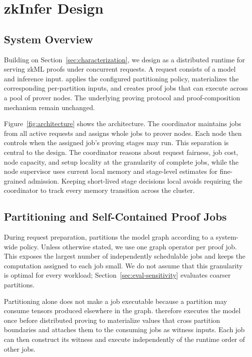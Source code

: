 \section{zkInfer Design}
\label{sec:design}

\subsection{System Overview}
\label{sec:system-overview}

Building on Section~\ref{sec:characterization}, we design \TITLE{} as a distributed runtime for serving zkML proofs under concurrent requests. A request consists of a model and inference input. \TITLE{} applies the configured partitioning policy, materializes the corresponding per-partition inputs, and creates proof jobs that can execute across a pool of prover nodes. The underlying proving protocol and proof-composition mechanism remain unchanged.

Figure~\ref{fig:architecture} shows the architecture. The coordinator maintains jobs from all active requests and assigns whole jobs to prover nodes. Each node then controls when the assigned job's proving stages may run. This separation is central to the design. The coordinator reasons about request fairness, job cost, node capacity, and setup locality at the granularity of complete jobs, while the node supervisor uses current local memory and stage-level estimates for fine-grained admission. Keeping short-lived stage decisions local avoids requiring the coordinator to track every memory transition across the cluster.

\subsection{Partitioning and Self-Contained Proof Jobs}
\label{sec:self-contained-proving-jobs}

During request preparation, \TITLE{} partitions the model graph according to a system-wide policy. Unless otherwise stated, we use one graph operator per proof job. This exposes the largest number of independently schedulable jobs and keeps the computation assigned to each job small. We do not assume that this granularity is optimal for every workload; Section~\ref{sec:eval-sensitivity} evaluates coarser partitions.

Partitioning alone does not make a job executable because a partition may consume tensors produced elsewhere in the graph. \TITLE{} therefore executes the model once before distributed proving to materialize values that cross partition boundaries and attaches them to the consuming jobs as witness inputs. Each job can then construct its witness and execute independently of the runtime order of other jobs.

